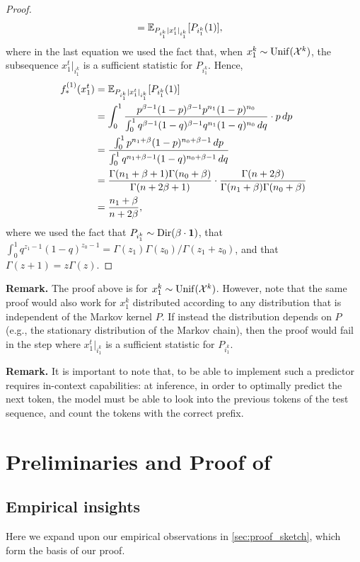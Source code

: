 \begin{proof}
\begin{align*}
&= \mathbb{E}_{P_{i_1^k} | x_1^t|_{i_1^k}} [P_{i_1^k}(1)],
\end{align*}
where in the last equation we used the fact that, when $x_1^k \sim \mathrm{Unif}(\mathcal{X}^k)$, the subsequence $x_1^t|_{i_1^k}$ is a sufficient statistic for $P_{i_1^k}$. Hence,
\begin{align*}
f_*^{(1)}(x_1^t) &= \mathbb{E}_{P_{i_1^k} | x_1^t|_{i_1^k}} [P_{i_1^k}(1)] \\
&= \int_0^1 \frac{p^{\beta-1}(1-p)^{\beta-1} p^{n_1} (1-p)^{n_0}}{\int_0^1 q^{\beta-1}(1-q)^{\beta-1} q^{n_1} (1-q)^{n_0} \, dq} \cdot p\, dp \\
&= \frac{\int_0^1 p^{n_1+\beta}(1-p)^{n_0+\beta-1} \, dp}{\int_0^1 q^{n_1+\beta-1}(1-q)^{n_0+\beta-1} \, dq} \\
&= \frac{\Gamma(n_1+\beta+1)\Gamma(n_0+\beta)}{\Gamma(n+2\beta+1)} \cdot \frac{\Gamma(n+2\beta)}{\Gamma(n_1+\beta)\Gamma(n_0+\beta)} \\
&= \frac{n_1 + \beta}{n+2\beta},
\end{align*}
where we used the fact that $P_{i_1^k} \sim \mathrm{Dir}(\beta \cdot \bm{1})$, that $\int_0^1 q^{z_1-1} (1-q)^{z_0-1} = \Gamma(z_1) \Gamma(z_0) / \Gamma(z_1 + z_0)$, and that $\Gamma(z+1) = z \Gamma(z)$.
\end{proof}

{\bf Remark.} The proof above is for $x_1^k \sim \mathrm{Unif}(\mathcal{X}^k)$. However, note that the same proof would also work for $x_1^k$ distributed according to any distribution that is independent of the Markov kernel $P$. If instead the distribution depends on $P$ (e.g., the stationary distribution of the Markov chain), then the proof would fail in the step where $x_1^t|_{i_1^k}$ is a sufficient statistic for $P_{i_1^k}$.

{\bf Remark.} It is important to note that, to be able to implement such a predictor requires in-context capabilities: at inference, in order to optimally predict the next token, the model must be able to look into the previous tokens of the test sequence, and count the tokens with the correct prefix. 


\section{Preliminaries and Proof of }
\label{app:proof1}
\subsection{Empirical insights}
\label{sec:warmup}
Here we expand upon our empirical observations in \ref{sec:proof_sketch}, which form the basis of our proof.

